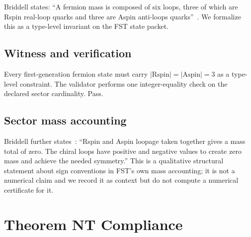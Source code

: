 \documentclass[12pt,a4paper]{article}
\begin{document}
Briddell states: ``A fermion mass is composed of six loops, three of
which are Rspin real-loop quarks and three are Aspin anti-loops
quarks''~\cite[line 795]{briddellbook2020}. We formalize this as
a type-level invariant on the FST state packet.

\subsection{Witness and verification}

Every first-generation fermion state must carry
$|\text{Rspin}| = |\text{Aspin}| = 3$ as a type-level constraint.
The validator performs one integer-equality check on the declared
sector cardinality. Pass.

\subsection{Sector mass accounting}

Briddell further states~\cite[line 861]{briddellbook2020}: ``Rspin and
Aspin loopage taken together gives a mass total of zero. The chiral
loops have positive and negative values to create zero mass and achieve
the needed symmetry.'' This is a qualitative structural statement
about sign conventions in FST's own mass accounting; it is not a
numerical claim and we record it as context but do not compute a
numerical certificate for it.


\section{Theorem NT Compliance}
\end{document}
